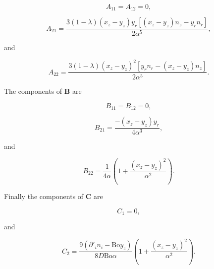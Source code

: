\documentclass[12pt]{article}
\begin{document}
\begin{equation}
\label{equ:A11_spec}
A_{11} = A_{12} = 0,
\end{equation}

\begin{equation}
\label{equ:A21_spec}
A_{21} = \frac{3 (1 - \lambda) (x_{z} - y_{z}) y_{r} [(x_{z} - y_{z}) n_{z} - y_{r} n_{r}]}{2 \alpha^{5}},
\end{equation}

and

\begin{equation}
\label{equ:A22_spec}
A_{22} = \frac{3 (1 - \lambda) (x_{z} - y_{z})^{2} [y_{r} n_{r} - (x_{z} - y_{z}) n_{z}]}{2 \alpha^{5}}.
\end{equation}

The components of $\boldsymbol{B}$ are

\begin{equation}
\label{equ:B11_spec}
B_{11} = B_{12} = 0,
\end{equation}

\begin{equation}
\label{equ:B21_spec}
B_{21} = \frac{-(x_{z} - y_{z}) y_{r}}{4 \alpha^{3}},
\end{equation}

and

\begin{equation}
\label{equ:B22_spec}
B_{22} = \frac{1}{4 \alpha} \left(1 + \frac{(x_{z} - y_{z})^{2}}{\alpha^{2}} \right).
\end{equation}

Finally the components of $\boldsymbol{C}$ are

\begin{equation}
\label{equ:C1_spec}
C_{1} = 0 ,
\end{equation}

and

\begin{equation}
\label{equ:C2_spec}
C_{2} = \frac{9 (\partial'_{i} n_{i} - \text{Bo} y_{z})}{8 D \text{Bo} \alpha} \left(1 + \frac{(x_{z} - y_{z})^{2}}{\alpha^{2}} \right).
\end{equation}




\end{document}
